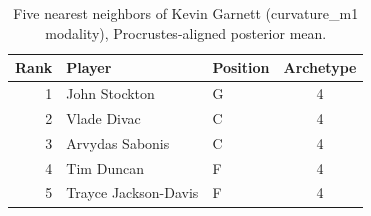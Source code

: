 \begin{table}[htbp]
  \centering\small
  \begin{tabular}{rllc}
    \toprule
    Rank & Player & Position & Archetype \\
    \midrule
    1 & John Stockton & G & 4 \\
    2 & Vlade Divac & C & 4 \\
    3 & Arvydas Sabonis & C & 4 \\
    4 & Tim Duncan & F & 4 \\
    5 & Trayce Jackson-Davis & F & 4 \\
    \bottomrule
  \end{tabular}
  \caption{Five nearest neighbors of Kevin Garnett (curvature_m1 modality), Procrustes-aligned posterior mean.}
  \label{tab:Kevin_Garnett_neighbors_curvature_m1}
\end{table}

